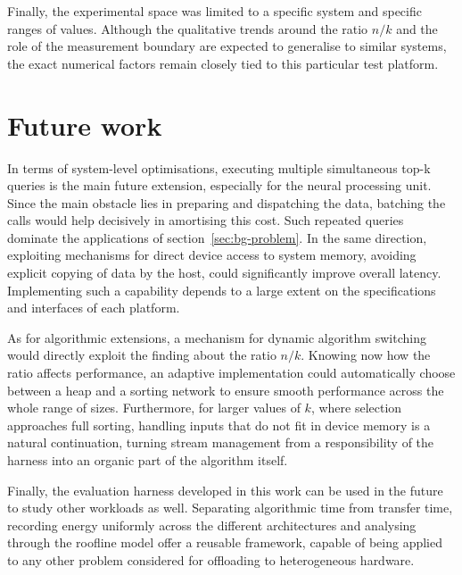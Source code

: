 Finally, the experimental space was limited to a specific system and specific
ranges of values. Although the qualitative trends around the ratio $n/k$ and
the role of the measurement boundary are expected to generalise to similar
systems, the exact numerical factors remain closely tied to this particular
test platform.

\section{Future work}
\label{sec:concl-future}

In terms of system-level optimisations, executing multiple simultaneous top-k
queries is the main future extension, especially for the neural processing
unit. Since the main obstacle lies in preparing and dispatching the data,
batching the calls would help decisively in amortising this cost. Such repeated
queries dominate the applications of section~\ref{sec:bg-problem}. In the same
direction, exploiting mechanisms for direct device access to system memory,
avoiding explicit copying of data by the host, could significantly improve
overall latency. Implementing such a capability depends to a large extent on
the specifications and interfaces of each platform.

As for algorithmic extensions, a mechanism for dynamic algorithm switching
would directly exploit the finding about the ratio $n/k$. Knowing now how the
ratio affects performance, an adaptive implementation could automatically
choose between a heap and a sorting network to ensure smooth performance across
the whole range of sizes. Furthermore, for larger values of $k$, where
selection approaches full sorting, handling inputs that do not fit in device
memory is a natural continuation, turning stream management from a
responsibility of the harness into an organic part of the algorithm itself.

Finally, the evaluation harness developed in this work can be used in the
future to study other workloads as well. Separating algorithmic time from
transfer time, recording energy uniformly across the different architectures
and analysing through the roofline model offer a reusable framework, capable of
being applied to any other problem considered for offloading to heterogeneous
hardware.
